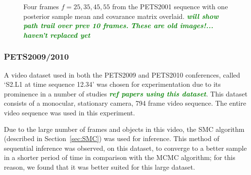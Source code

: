 \documentclass[smallcondensed, final]{svjour3}
\newcommand{\willie}[1]{\textcolor{green}{\textsf{\emph{\textbf{\textcolor{green}{#1}}}}}}
\begin{document}
\begin{figure}[h]
  \centering             
  \caption{Four frames $f=25, 35, 45, 55$ from the PETS2001 sequence with one posterior sample mean and covarance matrix overlaid. \willie{will show path trail over prev 10 frames.} \willie{These are old images!... haven't replaced yet}}
  \label{fig:pets2001_imgs}
\end{figure}




\subsubsection{PETS2009/2010}

A video dataset used in both the PETS2009 and PETS2010 conferences, called `S2.L1 at time sequence 12.34' was chosen for experimentation due to its prominence in a number of studies \willie{ref papers using this dataset}. This dataset consists of a monocular, stationary camera, 794 frame video sequence. The entire video sequence was used in this experiment. 

Due to the large number of frames and objects in this video, the SMC algorithm (described in Section~\ref{sec:SMC}) was used for inference. This method of sequential inference was observed, on this dataset, to converge to a better sample in a shorter period of time in comparison with the MCMC algorithm; for this reason, we found that it was better suited for this large dataset.
\end{document}
